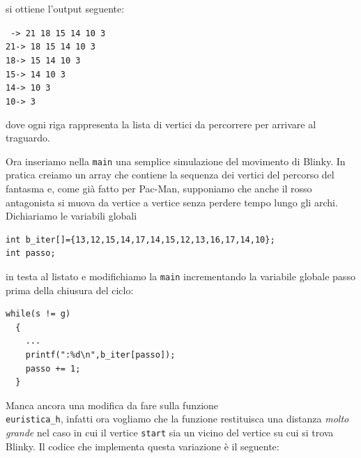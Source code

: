 \documentclass[8pt]{book}
\begin{document}
si ottiene l'output seguente:

\texttt{
  -\textgreater{} 21 18 15 14 10 3\\
21-\textgreater{} 18 15 14 10 3\\
18-\textgreater{} 15 14 10 3\\
15-\textgreater{} 14 10 3\\
14-\textgreater{} 10 3\\
10-\textgreater{} 3\\
}

dove ogni riga rappresenta la lista di vertici da percorrere per arrivare al traguardo.

Ora inseriamo nella \texttt{main} una semplice simulazione del movimento di Blinky. In pratica creiamo un array che contiene la sequenza dei vertici del percorso del fantasma e, come già fatto per Pac-Man, supponiamo che anche il rosso antagonista si muova da vertice a vertice senza perdere tempo lungo gli archi.\\
Dichiariamo le variabili globali

\begin{spacing}{0.9}
  \begin{small}
    \begin{tcolorbox}
\begin{verbatim}
int b_iter[]={13,12,15,14,17,14,15,12,13,16,17,14,10};
int passo;
\end{verbatim}
  \end{tcolorbox}
    \end{small}
      \end{spacing}

in testa al listato e modifichiamo la \texttt{main} incrementando la variabile globale passo prima della chiusura del ciclo:\\

\begin{spacing}{0.9}
  \begin{small}
    \begin{tcolorbox}
\begin{verbatim}
while(s != g)
  {
    ...
    printf(":%d\n",b_iter[passo]);
    passo += 1;
  }
\end{verbatim}
  \end{tcolorbox}
    \end{small}
      \end{spacing}


Manca ancora una modifica da fare sulla funzione \\\texttt{euristica\_h}, infatti ora vogliamo che la funzione restituisca una distanza \emph{molto grande} nel caso in cui il vertice \texttt{start} sia un vicino del vertice su cui si trova Blinky. Il codice che implementa questa variazione è il seguente:
\end{document}
